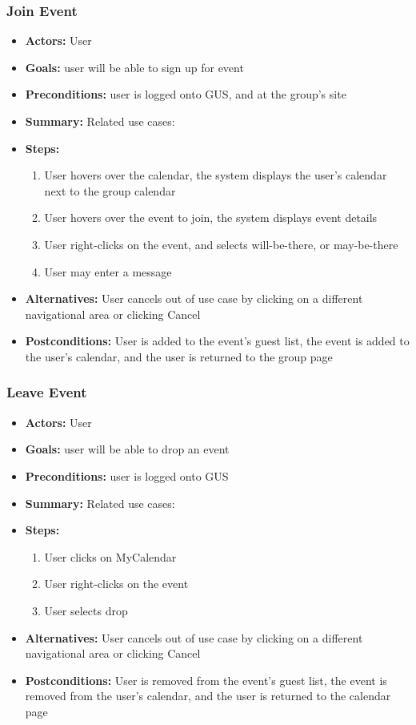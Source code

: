 \documentclass[12pt, oneside, letterpaper]{report}
\begin{document}
	      \subsubsection{Join Event}
			\begin{itemize}
				\item{\textbf{Actors:} User}
				\item{\textbf{Goals:} user will be able to sign up for event}
				\item{\textbf{Preconditions:} user is logged onto GUS, and at the group's site}
				\item{\textbf{Summary:} Related use cases: }
				\item{\textbf{Steps:}
				\begin{enumerate}
					\item{User hovers over the calendar, the system displays the user's calendar next to the group calendar}
					\item{User hovers over the event to join, the system displays event details}
					\item{User right-clicks on the event, and selects will-be-there, or may-be-there}
					\item{User may enter a message}
				\end{enumerate}
				}
				\item{\textbf{Alternatives:} User cancels out of use case by clicking on a different navigational area or clicking Cancel}
				\item{\textbf{Postconditions:} User is added to the event's guest list, the event is added to the user's calendar, and the user is returned to the group page}
			\end{itemize}
         \subsubsection{Leave Event}
			\begin{itemize}
				\item{\textbf{Actors:} User}
				\item{\textbf{Goals:} user will be able to drop an event}
				\item{\textbf{Preconditions:} user is logged onto GUS}
				\item{\textbf{Summary:} Related use cases: }
				\item{\textbf{Steps:}
				\begin{enumerate}
					\item{User clicks on MyCalendar}
					\item{User right-clicks on the event}
					\item{User selects drop}
				\end{enumerate}
				}
				\item{\textbf{Alternatives:} User cancels out of use case by clicking on a different navigational area or clicking Cancel}
				\item{\textbf{Postconditions:} User is removed from the event's guest list, the event is removed from the user's calendar, and the user is returned to the calendar page}
			\end{itemize}
\end{document}
